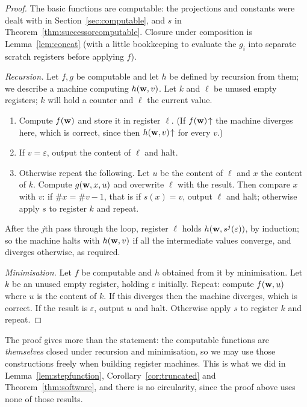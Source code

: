 \documentclass[a4paper]{scrartcl}
\newcommand{\eps}{\varepsilon}
\begin{document}
\begin{proof}
	The basic functions are computable: the projections and constants were dealt with in Section~\ref{sec:computable}, and $s$ in Theorem~\ref{thm:successorcomputable}. Closure under composition is Lemma~\ref{lem:concat} (with a little bookkeeping to evaluate the $g_i$ into separate scratch registers before applying $f$).

	\emph{Recursion.} Let $f,g$ be computable and let $h$ be defined by recursion from them; we describe a machine computing $h(\mathbf{w}, v)$. Let $k$ and $\ell$ be unused empty registers; $k$ will hold a counter and $\ell$ the current value.
	\begin{enumerate}[label=(\roman*)]
		\item Compute $f(\mathbf{w})$ and store it in register $\ell$. (If $f(\mathbf{w})\!\uparrow$ the machine diverges here, which is correct, since then $h(\mathbf{w}, v)\!\uparrow$ for every $v$.)
		\item If $v = \eps$, output the content of $\ell$ and halt.
		\item Otherwise repeat the following. Let $u$ be the content of $\ell$ and $x$ the content of $k$. Compute $g(\mathbf{w}, x, u)$ and overwrite $\ell$ with the result. Then compare $x$ with $v$: if $\#x = \#v - 1$, that is if $s(x) = v$, output $\ell$ and halt; otherwise apply $s$ to register $k$ and repeat.
	\end{enumerate}
	After the $j$th pass through the loop, register $\ell$ holds $h(\vv w, s^j(\eps))$, by induction; so the machine halts with $h(\mathbf{w}, v)$ if all the intermediate values converge, and diverges otherwise, as required.

	\emph{Minimisation.} Let $f$ be computable and $h$ obtained from it by minimisation. Let $k$ be an unused empty register, holding $\eps$ initially. Repeat: compute $f(\mathbf{w}, u)$ where $u$ is the content of $k$. If this diverges then the machine diverges, which is correct. If the result is $\eps$, output $u$ and halt. Otherwise apply $s$ to register $k$ and repeat.
\end{proof}

\begin{remark}
	The proof gives more than the statement: the computable functions are \emph{themselves} closed under recursion and minimisation, so we may use those constructions freely when building register machines. This is what we did in Lemma~\ref{lem:stepfunction}, Corollary~\ref{cor:truncated} and Theorem~\ref{thm:software}, and there is no circularity, since the proof above uses none of those results.
\end{remark}
\end{document}
